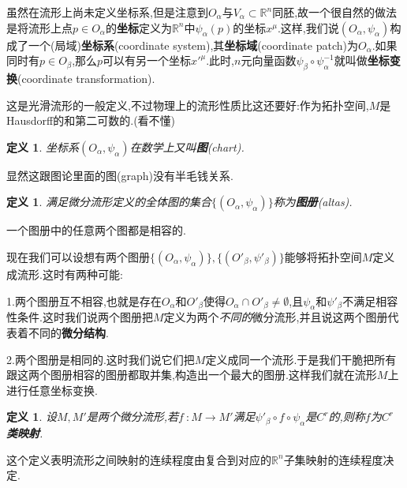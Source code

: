 \documentclass[UTF8]{article}
\begin{document}
	虽然在流形上尚未定义坐标系,但是注意到$O_{\alpha}$与$V_{\alpha} \subset \mathbb{R}^n$同胚,故一个很自然的做法是将流形上点$p \in O_{\alpha}$的\textbf{坐标}定义为$\mathbb{R}^n$中$\psi_{\alpha}(p)$的坐标$x^{\mu}$.这样,我们说$(O_{\alpha},\psi_{\alpha})$构成了一个(局域)\textbf{坐标系}(coordinate system),其\textbf{坐标域}(coordinate patch)为$O_{\alpha}$.如果同时有$p \in O_{\beta}$,那么$p$可以有另一个坐标$x'^{\mu}$.此时,$n$元向量函数$\psi_{\beta} \circ \psi_{\alpha}^{-1}$就叫做\textbf{坐标变换}(coordinate transformation).
	
	这是光滑流形的一般定义,不过物理上的流形性质比这还要好:作为拓扑空间,$M$是Hausdorff的和第二可数的.(看不懂)
	
	\newtheorem*{chart}{定义}
	
	\begin{chart}
		坐标系$(O_{\alpha},\psi_{\alpha})$在数学上又叫\textbf{图}(chart).
	\end{chart}
	
	显然这跟图论里面的图(graph)没有半毛钱关系.
	
	\newtheorem*{altas}{定义}
	
	\begin{altas}
		满足微分流形定义的全体图的集合$\{(O_{\alpha},\psi_{\alpha})\}$称为\textbf{图册}(altas).
	\end{altas}
	
	一个图册中的任意两个图都是相容的.
	
	现在我们可以设想有两个图册$\{(O_{\alpha},\psi_{\alpha})\},\{(O'_{\beta},\psi'_{\beta})\}$能够将拓扑空间$M$定义成流形.这时有两种可能:
	
	1.两个图册互不相容,也就是存在$O_{\alpha}$和$O'_{\beta}$使得$O_{\alpha} \cap O'_{\beta} \ne \emptyset$,且$\psi_{\alpha}$和$\psi'_{\beta}$不满足相容性条件.这时我们说两个图册把$M$定义为两个\textit{不同的}微分流形,并且说这两个图册代表着不同的\textbf{微分结构}.
	
	2.两个图册是相同的.这时我们说它们把$M$定义成同一个流形.于是我们干脆把所有跟这两个图册相容的图册都取并集,构造出一个最大的图册.这样我们就在流形$M$上进行任意坐标变换.
	
	\newtheorem*{CrMap}{定义}
	
	\begin{CrMap}
		设$M,M'$是两个微分流形,若$f~: M \to M'$满足$\psi'_{\beta} \circ f \circ \psi_{\alpha}$是$C^{r}$的,则称$f$为\textbf{$C^{r}$类映射}.
	\end{CrMap}

	这个定义表明流形之间映射的连续程度由复合到对应的$\mathbb{R}^n$子集映射的连续程度决定.
	
\end{document}

